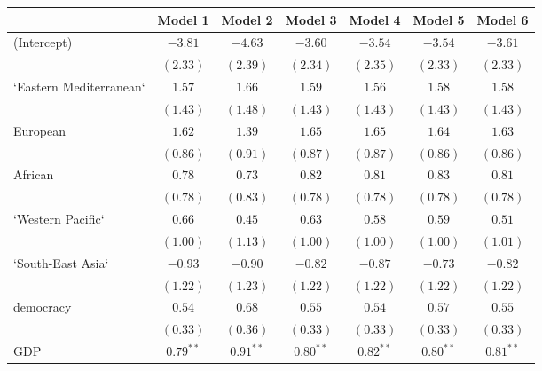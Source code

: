
\begin{table}[!h]
\begin{center}
\begin{tabular}{l c c c c c c }
\toprule
 & Model 1 & Model 2 & Model 3 & Model 4 & Model 5 & Model 6 \\
\midrule
(Intercept)             & $-3.81$      & $-4.63$      & $-3.60$      & $-3.54$      & $-3.54$      & $-3.61$      \\
                        & $(2.33)$     & $(2.39)$     & $(2.34)$     & $(2.35)$     & $(2.33)$     & $(2.33)$     \\
`Eastern Mediterranean` & $1.57$       & $1.66$       & $1.59$       & $1.56$       & $1.58$       & $1.58$       \\
                        & $(1.43)$     & $(1.48)$     & $(1.43)$     & $(1.43)$     & $(1.43)$     & $(1.43)$     \\
European                & $1.62$       & $1.39$       & $1.65$       & $1.65$       & $1.64$       & $1.63$       \\
                        & $(0.86)$     & $(0.91)$     & $(0.87)$     & $(0.87)$     & $(0.86)$     & $(0.86)$     \\
African                 & $0.78$       & $0.73$       & $0.82$       & $0.81$       & $0.83$       & $0.81$       \\
                        & $(0.78)$     & $(0.83)$     & $(0.78)$     & $(0.78)$     & $(0.78)$     & $(0.78)$     \\
`Western Pacific`       & $0.66$       & $0.45$       & $0.63$       & $0.58$       & $0.59$       & $0.51$       \\
                        & $(1.00)$     & $(1.13)$     & $(1.00)$     & $(1.00)$     & $(1.00)$     & $(1.01)$     \\
`South-East Asia`       & $-0.93$      & $-0.90$      & $-0.82$      & $-0.87$      & $-0.73$      & $-0.82$      \\
                        & $(1.22)$     & $(1.23)$     & $(1.22)$     & $(1.22)$     & $(1.22)$     & $(1.22)$     \\
democracy               & $0.54$       & $0.68$       & $0.55$       & $0.54$       & $0.57$       & $0.55$       \\
                        & $(0.33)$     & $(0.36)$     & $(0.33)$     & $(0.33)$     & $(0.33)$     & $(0.33)$     \\
GDP                     & $0.79^{**}$  & $0.91^{**}$  & $0.80^{**}$  & $0.82^{**}$  & $0.80^{**}$  & $0.81^{**}$  \\

\end{tabular}
\end{center}
\end{table}
